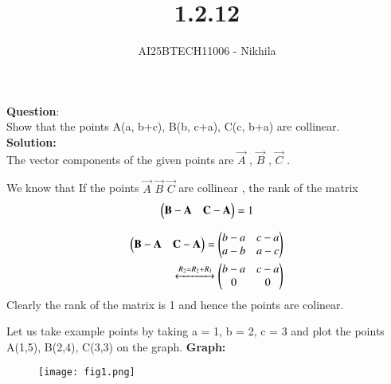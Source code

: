 \documentclass[journal]{IEEEtran}
\begin{document}

\vspace{3cm}

\title{1.2.12}
\author{AI25BTECH11006 - Nikhila}
{\let\newpage\relax\maketitle}


\renewcommand{\thefigure}{\theenumi}
\renewcommand{\thetable}{\theenumi}
\setlength{\intextsep}{10pt} %


\renewcommand{\thetable}{\theenumi}


\textbf{Question}:\\

Show that the points A(a, b+c), B(b, c+a), C(c, b+a) are collinear.\\

\textbf{Solution: }\\

The vector components of the given points are $\vec{A}$ , $\vec{B}$ , $\vec{C}$ . 

\vspace{2em}

We know that If the points $\vec{A}$ $\vec{B}$ $\vec{C}$ are collinear , the rank of the matrix 
\begin{align}
   \begin{pmatrix}\mathbf{B} - \mathbf{A} & \mathbf{C} - \mathbf{A}\end{pmatrix} = 1
\end{align}

\begin{align}
    \begin{pmatrix}\mathbf{B} - \mathbf{A} & \mathbf{C} - \mathbf{A}\end{pmatrix} = \begin{pmatrix}b-a & c-a \\ a-b & a-c\end{pmatrix}\\
    \xleftrightarrow[]{R_2 = R_2 + R_1}
    \begin{pmatrix}b-a & c-a\\ 0 & 0\end{pmatrix}
\end{align}
\quad Clearly the rank of the matrix is 1 and hence the points are colinear.

\vspace{2em}

Let us take example points by taking a = 1, b = 2, c = 3 and plot the points A(1,5), B(2,4), C(3,3) on the graph.
\newpage
\textbf{Graph:}

\begin{figure}[h!]
   \centering
   \texttt{[image: fig1.png]}
   \caption{}
   \label{stemplot}
\end{figure}
\end{document}
